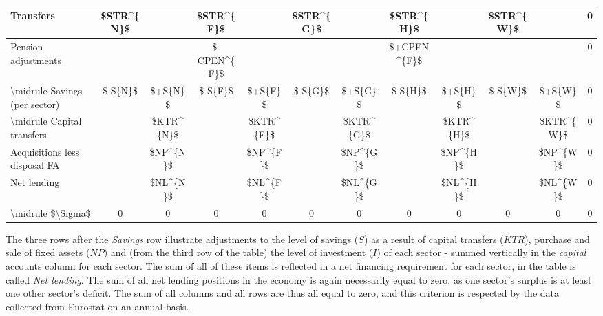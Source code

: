\documentclass[
]{book}
\begin{document}
\begin{table}
\begin{tabular}[t]{l|c|c|c|c|c|c|c|c|c|c|c}
\hline
Transfers & \$STR\textasciicircum{}\{N\}\$ &  & \$STR\textasciicircum{}\{F\}\$ &  & \$STR\textasciicircum{}\{G\}\$ &  & \$STR\textasciicircum{}\{H\}\$ &  & \$STR\textasciicircum{}\{W\}\$ &  & 0\\
\hline
Pension adjustments &  &  & \$-CPEN\textasciicircum{}\{F\}\$ &  &  &  & \$+CPEN\textasciicircum{}\{F\}\$ &  &  &  & 0\\
\hline
\textbackslash{}midrule Savings (per sector) & \$-S\{N\}\$ & \$+S\{N\}\$ & \$-S\{F\}\$ & \$+S\{F\}\$ & \$-S\{G\}\$ & \$+S\{G\}\$ & \$-S\{H\}\$ & \$+S\{H\}\$ & \$-S\{W\}\$ & \$+S\{W\}\$ & 0\\
\hline
\textbackslash{}midrule Capital transfers &  & \$KTR\textasciicircum{}\{N\}\$ &  & \$KTR\textasciicircum{}\{F\}\$ &  & \$KTR\textasciicircum{}\{G\}\$ &  & \$KTR\textasciicircum{}\{H\}\$ &  & \$KTR\textasciicircum{}\{W\}\$ & 0\\
\hline
Acquisitions less disposal FA &  & \$NP\textasciicircum{}\{N\}\$ &  & \$NP\textasciicircum{}\{F\}\$ &  & \$NP\textasciicircum{}\{G\}\$ &  & \$NP\textasciicircum{}\{H\}\$ &  & \$NP\textasciicircum{}\{W\}\$ & 0\\
\hline
Net lending &  & \$NL\textasciicircum{}\{N\}\$ &  & \$NL\textasciicircum{}\{F\}\$ &  & \$NL\textasciicircum{}\{G\}\$ &  & \$NL\textasciicircum{}\{H\}\$ &  & \$NL\textasciicircum{}\{W\}\$ & 0\\
\hline
\textbackslash{}midrule \$\textbackslash{}Sigma\$ & 0 & 0 & 0 & 0 & 0 & 0 & 0 & 0 & 0 & 0 & 0\\
\hline
\end{tabular}
\end{table}

The three rows after the \emph{Savings} row illustrate adjustments to the level of savings (\(S\)) as a result of capital transfers (\(KTR\)), purchase and sale of fixed assets (\(NP\)) and (from the third row of the table) the level of investment (\(I\)) of each sector - summed vertically in the \emph{capital} accounts column for each sector. The sum of all of these items is reflected in a net financing requirement for each sector, in the table is called \emph{Net lending}. The sum of all net lending positions in the economy is again necessarily equal to zero, as one sector's surplus is at least one other sector's deficit. The sum of all columns and all rows are thus all equal to zero, and this criterion is respected by the data collected from Eurostat on an annual basis.
\end{document}
